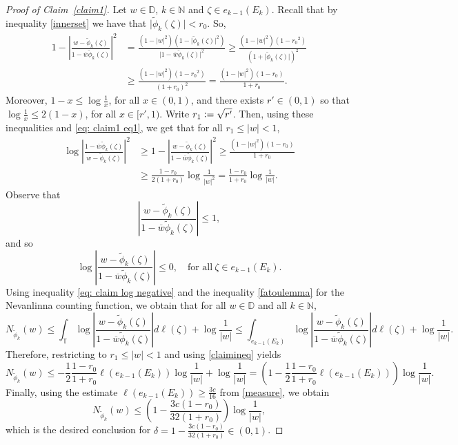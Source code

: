 \documentclass[11pt, reqno]{amsart}
\theoremstyle{definition}
\numberwithin{equation}{section}
\newcommand{\N}{\mathbb{N}}
\newcommand{\D}{\mathbb{D}}
\newcommand{\T}{\mathbb{T}}
\renewcommand{\geq}{\geqslant}
\renewcommand{\leq}{\leqslant}
\begin{document}
\begin{proof}[Proof of Claim~\ref{claim1}]
Let $w\in\D$, $k\in\N$ and $\zeta\in e_{k-1}(E_k)$. Recall that by inequality \eqref{innerset} we have that $\lvert\widetilde{\phi}_k(\zeta)\rvert <r_0$. So,
\begin{align}
1-\left\lvert \frac{w-\widetilde{\phi}_k(\zeta)}{1-\overline{w}\widetilde{\phi}_k(\zeta)} \right\rvert^2&=\frac{(1-\lvert w \rvert^2)(1-\lvert \widetilde{\phi}_k(\zeta) \rvert^2)}{\lvert 1- \overline{w}\widetilde{\phi}_k(\zeta)\rvert^2}\geq \frac{(1-\lvert w \rvert^2)(1-{r_0}^2)}{(1+\lvert\widetilde{\phi}_k(\zeta)\rvert)^2}\nonumber\\
	&\geq \frac{(1-\lvert w \rvert^2)(1-{r_0}^2)}{(1+r_0)^2}=\frac{(1-\lvert w \rvert^2)(1-{r_0})}{1+r_0}. \label{eq: claim1 eq1}
\end{align}
Moreover, $1-x\leq \log\frac{1}{x}$, for all $x\in(0,1)$, and there exists $r'\in(0,1)$ so that $\log\frac{1}{x}\leq 2(1-x)$, for all $x\in[r',1)$. Write $r_1\vcentcolon=\sqrt{r'}$. Then, using these inequalities and \eqref{eq: claim1 eq1}, we get that for all $r_1\leq\lvert w \rvert <1$,
\begin{align}
\log \left\lvert \frac{1-\overline{w}\widetilde{\phi}_k(\zeta)}{w-\widetilde{\phi}_k(\zeta)} \right\rvert^2&\geq 1-\left\lvert \frac{w-\widetilde{\phi}_k(\zeta)}{1-\overline{w}\widetilde{\phi}_k(\zeta)} \right\rvert^2\geq \frac{(1-\lvert w \rvert^2)(1-{r_0})}{1+r_0}\nonumber\\
	&\geq \frac{1-{r_0}}{2(1+r_0)}\log\frac{1}{\lvert w \rvert^2}=\frac{1-{r_0}}{1+r_0}\log\frac{1}{\lvert w \rvert}\label{claimineq}.
\end{align}
Observe that 
\[
\left\lvert \frac{w-\widetilde{\phi}_k(\zeta)}{1-\overline{w}\widetilde{\phi}_k(\zeta)} \right\rvert\leq 1,
\]
and so
\begin{equation}\label{eq: claim log negative}
\log\left\lvert \frac{w-\widetilde{\phi}_k(\zeta)}{1-\overline{w}\widetilde{\phi}_k(\zeta)} \right\rvert\leq 0, \quad\text{for all}\ \zeta\in e_{k-1}(E_k).
\end{equation}
Using inequality \eqref{eq: claim log negative} and the inequality \eqref{fatoulemma} for the Nevanlinna counting function, we obtain that for all $w\in\D$ and all $k\in\N$,
\[
N_{\widetilde{\phi}_k}(w)\leq \int_{\T}\log\left\lvert \frac{w-\widetilde{\phi}_k(\zeta)}{1-\overline{w}\widetilde{\phi}_k(\zeta)} \right\rvert d\ell(\zeta)+\log\frac{1}{\lvert w \rvert}\leq \int_{e_{k-1}(E_k)} \log\left\lvert \frac{w-\widetilde{\phi}_k(\zeta)}{1-\overline{w}\widetilde{\phi}_k(\zeta)} \right\rvert d\ell(\zeta)+\log\frac{1}{\lvert w \rvert}.
\]
Therefore, restricting to $r_1\leq \lvert w\rvert <1$ and using \eqref{claimineq} yields
\[
N_{\widetilde{\phi}_k}(w)\leq -\frac{1}{2}\frac{1-{r_0}}{1+r_0}\ell(e_{k-1}(E_k))\log\frac{1}{\lvert w \rvert} + \log\frac{1}{\lvert w \rvert} = \left(1-\frac{1}{2}\frac{1-{r_0}}{1+r_0}\ell(e_{k-1}(E_k))\right) \log\frac{1}{\lvert w \rvert}.
\]
Finally, using the estimate $\ell(e_{k-1}(E_k))\geq \frac{3c}{16}$ from \eqref{measure}, we obtain
\[
N_{\widetilde{\phi}_k}(w)\leq \left(1-\frac{3c(1-{r_0})}{32(1+r_0)}\right)\log\frac{1}{\lvert w \rvert},
\]
which is the desired conclusion for $\delta = 1-\frac{3c(1-{r_0})}{32(1+r_0)}\in (0,1)$.
\end{proof}
\end{document}
